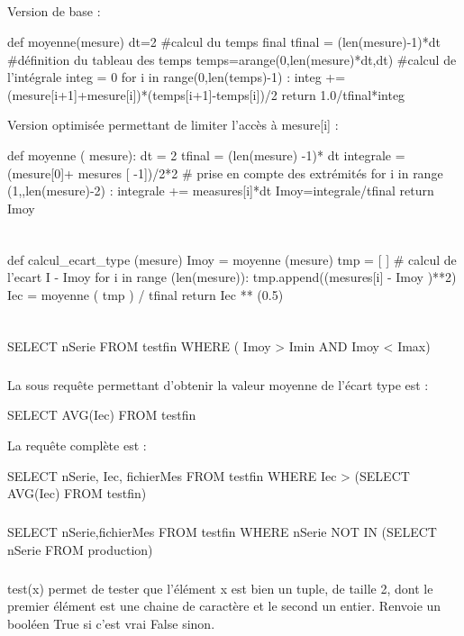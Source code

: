 \documentclass[10pt,fleqn]{article} %
\begin{document}
\subparagraph{}
Version de base :

\begin{python}
def moyenne(mesure)
    dt=2
    #calcul du temps final
    tfinal = (len(mesure)-1)*dt
    #définition du tableau des temps
    temps=arange(0,len(mesure)*dt,dt)
    #calcul de l'intégrale
    integ = 0
    for i in range(0,len(temps)-1) :
        integ += (mesure[i+1]+mesure[i])*(temps[i+1]-temps[i])/2
    return 1.0/tfinal*integ
\end{python}

Version optimisée permettant de limiter l’accès à mesure[i] :
\begin{python}
def moyenne ( mesure):
    dt  =  2
    tfinal = (len(mesure) -1)* dt
    integrale = (mesure[0]+ mesures [ -1])/2*2  # prise  en  compte  des  extrémités
    for i in range (1,,len(mesure)-2) :
        integrale += measures[i]*dt
    Imoy=integrale/tfinal
    return Imoy
\end{python}

\subparagraph{}
$\quad$
\begin{python}
def calcul_ecart_type (mesure)
    Imoy = moyenne (mesure)
    tmp  =  [ ]  # calcul  de  l'ecart  I  -  Imoy
    for  i  in range (len(mesure)):
        tmp.append((mesures[i] - Imoy )**2)
    Iec = moyenne ( tmp ) / tfinal
    return Iec ** (0.5)
\end{python}


\subparagraph{}
$\quad$

\begin{python}
SELECT nSerie FROM testfin WHERE ( Imoy > Imin AND Imoy < Imax)
\end{python}

\subparagraph{}
La sous requête permettant d’obtenir la valeur moyenne de l’écart type est : 
\begin{python}
SELECT AVG(Iec) FROM testfin
\end{python}

La requête complète est : 
\begin{python}
SELECT nSerie, Iec, fichierMes FROM testfin WHERE Iec > (SELECT AVG(Iec) FROM testfin)
\end{python}

\subparagraph{}
\begin{python}
SELECT nSerie,fichierMes FROM testfin WHERE nSerie NOT IN (SELECT nSerie FROM production)
\end{python}


\subparagraph{}
test(x) permet de tester que l’élément x est bien un tuple, de taille 2, dont le premier élément est une chaine de caractère et le second un entier. Renvoie un booléen True si c’est vrai False sinon.
\end{document}
